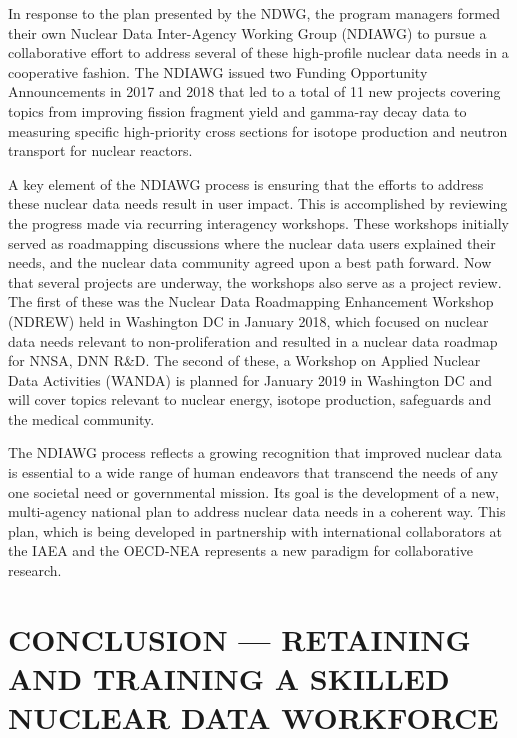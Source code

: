 \documentclass[letterpaper]{ar-1col}
\begin{document}
In response to the plan presented by the NDWG, the program managers formed their own Nuclear Data Inter-Agency Working Group (NDIAWG) to pursue a collaborative effort to address several of these high-profile nuclear data needs in a cooperative fashion.
 The NDIAWG issued two Funding Opportunity Announcements in 2017 and 2018 that led to a total of 11 new projects covering topics from improving fission fragment yield and gamma-ray decay data to measuring specific high-priority cross sections for isotope production and neutron transport for nuclear reactors.
  

A key element of the NDIAWG process is ensuring that the efforts to address these nuclear data needs result in user impact.
 This is accomplished by reviewing the progress made via recurring interagency workshops.
 These workshops initially served as roadmapping discussions where the nuclear data users explained their needs, and the nuclear data community agreed upon a best path forward.
 Now that several projects are underway, the workshops also serve as a project review.
The first of these was the Nuclear Data Roadmapping Enhancement Workshop (NDREW) held in Washington DC in January 2018, which focused on nuclear data needs relevant to non-proliferation \cite{Ndr18} and resulted in a nuclear data roadmap for NNSA, DNN R\&D.
 The second of these, a Workshop on Applied Nuclear Data Activities (WANDA) is planned for January 2019 in Washington DC and will cover topics relevant to nuclear energy, isotope production, safeguards and the medical community.
 

The NDIAWG process reflects a growing recognition that improved nuclear data is essential to a wide range of human endeavors that transcend the needs of any one societal need or governmental mission.
 Its goal is the development of a new, multi-agency national plan to address nuclear data needs in a coherent way.
 This plan, which is being developed in partnership with international collaborators at the IAEA and the OECD-NEA represents a new paradigm for collaborative research.
 

\section{CONCLUSION \texorpdfstring{---}{-} RETAINING AND TRAINING A SKILLED NUCLEAR DATA WORKFORCE}
\end{document}
